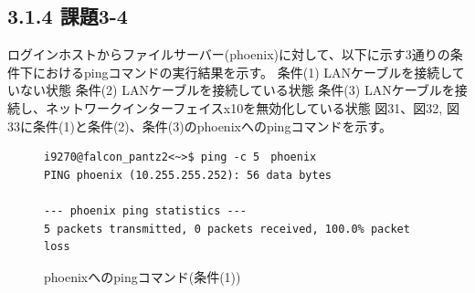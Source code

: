 \documentclass[12pt]{jreport}
\begin{document}
            \subsection*{3.1.4 課題3-4}
                ログインホストからファイルサーバー(phoenix)に対して、以下に示す3通りの条件下におけるpingコマンドの実行結果を示す。
                条件(1) LANケーブルを接続していない状態
                条件(2) LANケーブルを接続している状態
                条件(3) LANケーブルを接続し、ネットワークインターフェイスx10を無効化している状態
                図31、図32, 図33に条件(1)と条件(2)、条件(3)のphoenixへのpingコマンドを示す。
                \begin{figure}[H]
                    \begin{center}
                        \begin{screen}
                            \begin{verbatim}
i9270@falcon_pantz2<~>$ ping -c 5　phoenix
PING phoenix (10.255.255.252): 56 data bytes

--- phoenix ping statistics ---
5 packets transmitted, 0 packets received, 100.0% packet loss
                            \end{verbatim}
                        \end{screen}
                        \caption{phoenixへのpingコマンド(条件(1))}
                        \label{31}
                    \end{center}
                \end{figure}
\end{document}
